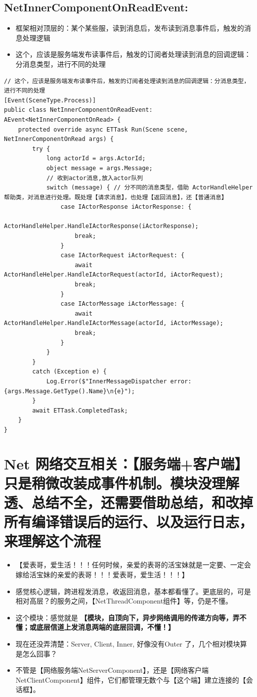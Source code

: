 \documentclass[9pt, b5paper]{article}
\begin{document}
\subsection{NetInnerComponentOnReadEvent:}
\label{sec-2-19}
\begin{itemize}
\item 框架相对顶层的：某个某些服，读到消息后，发布读到消息事件后，触发的消息处理逻辑
\item 这个，应该是服务端发布读事件后，触发的订阅者处理读到消息的回调逻辑：分消息类型，进行不同的处理
\end{itemize}
\begin{verbatim}
// 这个，应该是服务端发布读事件后，触发的订阅者处理读到消息的回调逻辑：分消息类型，进行不同的处理
[Event(SceneType.Process)]
public class NetInnerComponentOnReadEvent: AEvent<NetInnerComponentOnRead> {
    protected override async ETTask Run(Scene scene, NetInnerComponentOnRead args) {
        try {
            long actorId = args.ActorId;
            object message = args.Message;
            // 收到actor消息,放入actor队列
            switch (message) { // 分不同的消息类型，借助 ActorHandleHelper 帮助类，对消息进行处理。既处理【请求消息】，也处理【返回消息】，还【普通消息】
                case IActorResponse iActorResponse: {
                    ActorHandleHelper.HandleIActorResponse(iActorResponse);
                    break;
                }
                case IActorRequest iActorRequest: {
                    await ActorHandleHelper.HandleIActorRequest(actorId, iActorRequest);
                    break;
                }
                case IActorMessage iActorMessage: {
                    await ActorHandleHelper.HandleIActorMessage(actorId, iActorMessage);
                    break;
                }
            }
        }
        catch (Exception e) {
            Log.Error($"InnerMessageDispatcher error: {args.Message.GetType().Name}\n{e}");
        }
        await ETTask.CompletedTask;
    }
}
\end{verbatim}


\section{Net 网络交互相关：【服务端+客户端】只是稍微改装成事件机制。模块没理解透、总结不全，还需要借助总结，和改掉所有编译错误后的运行、以及运行日志，来理解这个流程}
\label{sec-3}
\begin{itemize}
\item 【爱表哥，爱生活！！！任何时候，亲爱的表哥的活宝妹就是一定要、一定会嫁给活宝妹的亲爱的表哥！！！爱表哥，爱生活！！！】
\item 感觉核心逻辑，跨进程发消息，收返回消息，基本都看懂了。更底层的，可是相对高层？的服务之间，【NetThreadComponent组件】等，仍是不懂。
\item 这个模块：感觉就是 \textbf{【模块，自顶向下，异步网络调用的传递方向等，弄不懂；或底层信道上发消息两端的底层回调，不懂！】}
\item 现在还没弄清楚：Server, Client, Inner, 好像没有Outer 了，几个相对模块算是怎么回事？
\item 不管是【网络服务端NetServerComponent】，还是【网络客户端 NetClientComponent】组件，它们都管理无数个与【这个端】建立连接的【会话框】。
\end{itemize}
\end{document}
